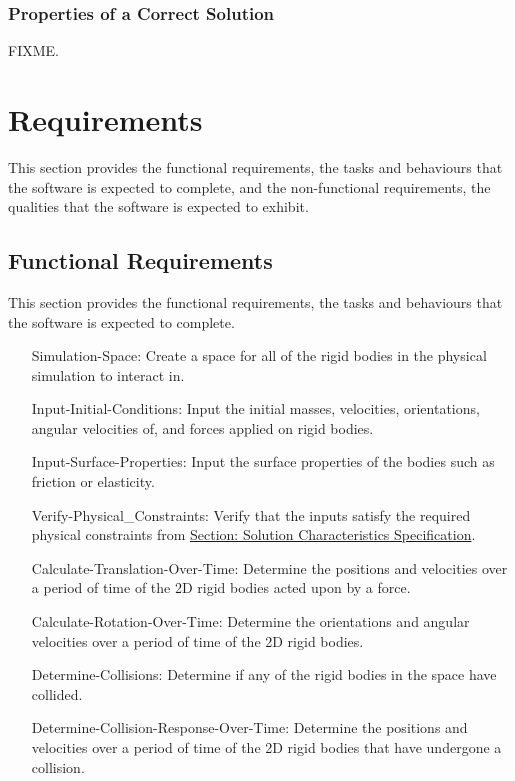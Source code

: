 \documentclass[12pt]{article}
\begin{document}
\subsubsection{Properties of a Correct Solution}
\label{Sec:CorSolProps}
FIXME.
\section{Requirements}
\label{Sec:Requirements}
This section provides the functional requirements, the tasks and behaviours that the software is expected to complete, and the non-functional requirements, the qualities that the software is expected to exhibit.
\subsection{Functional Requirements}
\label{Sec:FRs}
This section provides the functional requirements, the tasks and behaviours that the software is expected to complete.
\begin{itemize}
\item[Simulation-Space:\phantomsection\label{simSpace}]Create a space for all of the rigid bodies in the physical simulation to interact in.
\item[Input-Initial-Conditions:\phantomsection\label{inputInitialConds}]Input the initial masses, velocities, orientations, angular velocities of, and forces applied on rigid bodies.
\item[Input-Surface-Properties:\phantomsection\label{inputSurfaceProps}]Input the surface properties of the bodies such as friction or elasticity.
\item[Verify-Physical\_Constraints:\phantomsection\label{verifyPhysCons}]Verify that the inputs satisfy the required physical constraints from \hyperref[Sec:SolCharSpec]{Section: Solution Characteristics Specification}.
\item[Calculate-Translation-Over-Time:\phantomsection\label{calcTransOverTime}]Determine the positions and velocities over a period of time of the 2D rigid bodies acted upon by a force.
\item[Calculate-Rotation-Over-Time:\phantomsection\label{calcRotOverTime}]Determine the orientations and angular velocities over a period of time of the 2D rigid bodies.
\item[Determine-Collisions:\phantomsection\label{deterColls}]Determine if any of the rigid bodies in the space have collided.
\item[Determine-Collision-Response-Over-Time:\phantomsection\label{deterCollRespOverTime}]Determine the positions and velocities over a period of time of the 2D rigid bodies that have undergone a collision.
\end{itemize}
\end{document}
